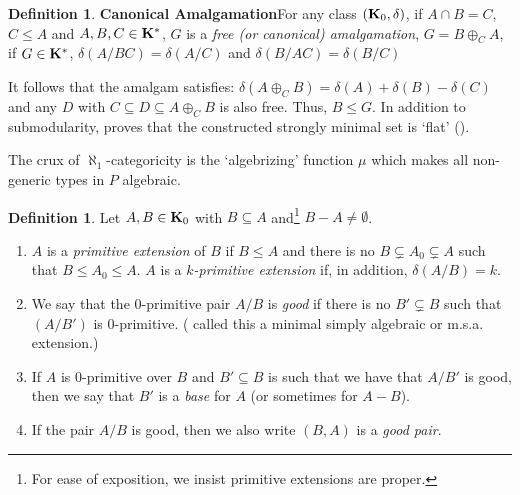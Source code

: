 \documentclass[11pt]{amsart}
\def\bK{{\bf K}}
\theoremstyle{definition}
\newtheorem{definition}[theorem]{Definition}
\theoremstyle{remark}
\numberwithin{equation}{section}
\begin{document}
\begin{definition}{\bf Canonical Amalgamation}\label{canamdef} For any class $(\bK_0,\delta)$,
    if $A\cap B = C$, $C\leq A$ and $A,B, C
    \in \bK^*$,  $G$ is a {\em free (or canonical) amalgamation},  $G = B \oplus_C
    A$,
    if
      $ G \in
    \bK^*$, $\delta(A/BC) = \delta(A/C)$ and $\delta(B/AC) = \delta(B/C)$

\end{definition}



It follows \cite[Lemma 3.10]{BaldwinPao} that the amalgam satisfies: $\delta(
A \oplus_{C} B)= \delta(A) +\delta(B) -
    \delta(C)$ and any $D$ with $C \subseteq D \subseteq A \oplus_{C} B$ is
    also free.  Thus, $B \leq G$.
    In addition to submodularity, \cite{BaldwinPao} proves that the
    constructed strongly minimal set is `flat' (\cite{Hrustrongmin}).

    The crux of $\aleph_1$-categoricity is the `algebrizing' function $\mu$ which makes
    all non-generic types in $P$ algebraic.

 \begin{definition}\label{prealgebraic} Let $A, B \in {\bK}_0$ with
 $B \subseteq A$ and\footnote{For ease of exposition, we insist primitive extensions
 are proper.} $B-A \neq \emptyset$.
	\begin{enumerate}
\item $A$ is a \emph{primitive extension} of $B$ if $B \leq A$ and there is
    no $B \subsetneq A_0 \subsetneq A$ such that $B\leq A_0 \leq A$. $A$ is
a {\em  $k$-primitive extension} if, in addition, $\delta(A/B) =k$.

	\item  We say that the $0$-primitive pair $A/B$ is {\em good} if there
is no $B' \subsetneq B$ such that  $(A/B')$ is $0$-primitive.
(\cite{Hrustrongmin} called this a minimal simply algebraic or m.s.a.
extension.)
	\item If $A$ is $0$-primitive over $B$ and $B' \subseteq B$ is such
 that we have that $A/B'$ is good, then we say that $B'$ is a {\em base}
 for $A$ (or sometimes for $A-B$).
	\item If the pair $A/B$ is good, then we also write $(B,A)$ is a {\em good pair}.
\end{enumerate}
\end{definition}
\end{document}

